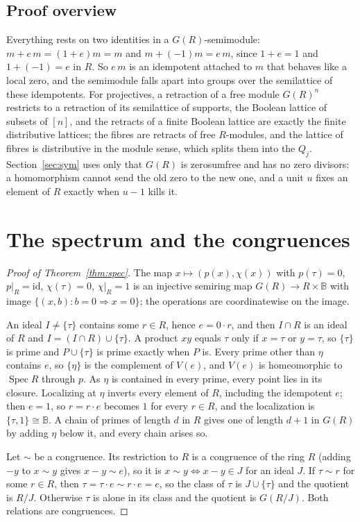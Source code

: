 \documentclass[11pt]{amsart}
\theoremstyle{remark}
\newcommand{\B}{\mathbb B}
\DeclareMathOperator{\Spec}{Spec}
\begin{document}
\subsection{Proof overview}
Everything rests on two identities in a $G(R)$-semimodule: $m+e\,m=(1+e)m=m$ and $m+(-1)m=e\,m$, since $1+e=1$ and $1+(-1)=e$ in $R$. So $e\,m$ is an idempotent attached to $m$ that behaves like a local zero, and the semimodule falls apart into groups over the semilattice of these idempotents. For projectives, a retraction of a free module $G(R)^n$ restricts to a retraction of its semilattice of supports, the Boolean lattice of subsets of $[n]$, and the retracts of a finite Boolean lattice are exactly the finite distributive lattices; the fibres are retracts of free $R$-modules, and the lattice of fibres is distributive in the module sense, which splits them into the $Q_j$. Section~\ref{sec:sym} uses only that $G(R)$ is zerosumfree and has no zero divisors: a homomorphism cannot send the old zero to the new one, and a unit $u$ fixes an element of $R$ exactly when $u-1$ kills it.

\section{The spectrum and the congruences}

\begin{proof}[Proof of Theorem~\ref{thm:spec}]
The map $x\mapsto(p(x),\chi(x))$ with $p(\tau)=0$, $p|_R=\mathrm{id}$, $\chi(\tau)=0$, $\chi|_R=1$ is an injective semiring map $G(R)\to R\times\B$ with image $\{(x,b):b=0\Rightarrow x=0\}$; the operations are coordinatewise on the image.

An ideal $I\ne\{\tau\}$ contains some $r\in R$, hence $e=0\cdot r$, and then $I\cap R$ is an ideal of $R$ and $I=(I\cap R)\cup\{\tau\}$. A product $xy$ equals $\tau$ only if $x=\tau$ or $y=\tau$, so $\{\tau\}$ is prime and $P\cup\{\tau\}$ is prime exactly when $P$ is. Every prime other than $\eta$ contains $e$, so $\{\eta\}$ is the complement of $V(e)$, and $V(e)$ is homeomorphic to $\Spec R$ through $p$. As $\eta$ is contained in every prime, every point lies in its closure. Localizing at $\eta$ inverts every element of $R$, including the idempotent $e$; then $e=1$, so $r=r\cdot e$ becomes $1$ for every $r\in R$, and the localization is $\{\tau,1\}\cong\B$. A chain of primes of length $d$ in $R$ gives one of length $d+1$ in $G(R)$ by adding $\eta$ below it, and every chain arises so.

Let $\sim$ be a congruence. Its restriction to $R$ is a congruence of the ring $R$ (adding $-y$ to $x\sim y$ gives $x-y\sim e$), so it is $x\sim y\iff x-y\in J$ for an ideal $J$. If $\tau\sim r$ for some $r\in R$, then $\tau=\tau\cdot e\sim r\cdot e=e$, so the class of $\tau$ is $J\cup\{\tau\}$ and the quotient is $R/J$. Otherwise $\tau$ is alone in its class and the quotient is $G(R/J)$. Both relations are congruences.
\end{proof}
\end{document}
